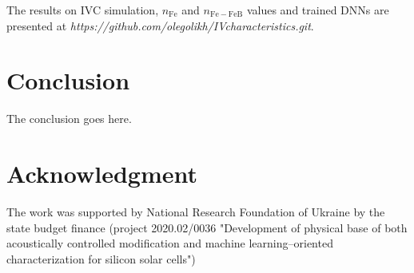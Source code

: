 \documentclass[journal]{IEEEtran}
\begin{document}
%




The results on IVC simulation, $n_\mathrm{Fe}$ and $n_\mathrm{Fe-FeB}$ values
and trained DNNs are presented at \emph{https://github.com/olegolikh/IVcharacteristics.git}.

\section{Conclusion}
The conclusion goes here.




\section*{Acknowledgment}

The work was supported by National Research Foundation  of Ukraine by the state budget finance
(project 2020.02/0036 "Development of physical base of both acoustically controlled modification and machine learning--oriented characterization for silicon solar cells")

\ifCLASSOPTIONcaptionsoff
  \newpage
\fi



\end{document}
